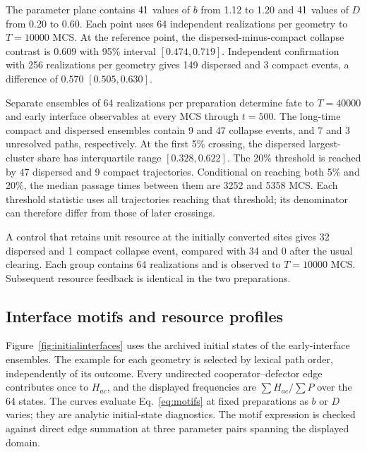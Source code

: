 The parameter plane contains $41$ values of $b$ from 1.12 to 1.20 and $41$ values of $D$ from 0.20 to 0.60. Each point uses 64 independent realizations per geometry to $T=10000$ MCS. At the reference point, the dispersed-minus-compact collapse contrast is $0.609$ with 95\% interval $[0.474,0.719]$. Independent confirmation with 256 realizations per geometry gives 149 dispersed and 3 compact events, a difference of $0.570$ $[0.505,0.630]$.

Separate ensembles of 64 realizations per preparation determine fate to $T=40000$ and early interface observables at every MCS through $t=500$. The long-time compact and dispersed ensembles contain 9 and 47 collapse events, and 7 and 3 unresolved paths, respectively. At the first 5\% crossing, the dispersed largest-cluster share has interquartile range $[0.328,0.622]$. The 20\% threshold is reached by 47 dispersed and 9 compact trajectories. Conditional on reaching both 5\% and 20\%, the median passage times between them are 3252 and 5358 MCS. Each threshold statistic uses all trajectories reaching that threshold; its denominator can therefore differ from those of later crossings.

A control that retains unit resource at the initially converted sites gives 32 dispersed and 1 compact collapse event, compared with 34 and 0 after the usual clearing. Each group contains 64 realizations and is observed to $T=10000$ MCS. Subsequent resource feedback is identical in the two preparations.

\subsection{Interface motifs and resource profiles}

Figure~\ref{fig:initialinterfaces} uses the archived initial states of the early-interface ensembles. The example for each geometry is selected by lexical path order, independently of its outcome. Every undirected cooperator--defector edge contributes once to $H_{ac}$, and the displayed frequencies are $\sum H_{ac}/\sum P$ over the 64 states. The curves evaluate Eq.~\eqref{eq:motifs} at fixed preparations as $b$ or $D$ varies; they are analytic initial-state diagnostics. The motif expression is checked against direct edge summation at three parameter pairs spanning the displayed domain.

